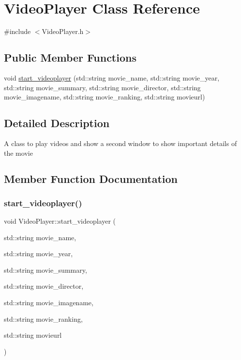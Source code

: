 \hypertarget{classVideoPlayer}{}\section{Video\+Player Class Reference}
\label{classVideoPlayer}


{\ttfamily \#include $<$Video\+Player.\+h$>$}

\subsection*{Public Member Functions}
\begin{DoxyCompactItemize}
\item 
void \hyperlink{classVideoPlayer_a351460db09fb4b4158711f99316ce512}{start\+\_\+videoplayer} (std\+::string movie\+\_\+name, std\+::string movie\+\_\+year, std\+::string movie\+\_\+summary, std\+::string movie\+\_\+director, std\+::string movie\+\_\+imagename, std\+::string movie\+\_\+ranking, std\+::string movieurl)
\end{DoxyCompactItemize}


\subsection{Detailed Description}
A class to play videos and show a second window to show important details of the movie 

\subsection{Member Function Documentation}
\mbox{\label{classVideoPlayer_a351460db09fb4b4158711f99316ce512}} 
\subsubsection{\texorpdfstring{start\+\_\+videoplayer()}{start\_videoplayer()}}
{\footnotesize\ttfamily void Video\+Player\+::start\+\_\+videoplayer (\begin{DoxyParamCaption}\item[{std\+::string}]{movie\+\_\+name,  }\item[{std\+::string}]{movie\+\_\+year,  }\item[{std\+::string}]{movie\+\_\+summary,  }\item[{std\+::string}]{movie\+\_\+director,  }\item[{std\+::string}]{movie\+\_\+imagename,  }\item[{std\+::string}]{movie\+\_\+ranking,  }\item[{std\+::string}]{movieurl }\end{DoxyParamCaption})\hspace{0.3cm}{\ttfamily [inline]}}

